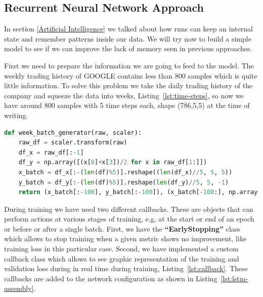 \subsection{Recurrent Neural Network Approach}

In section \ref{Artificial Intelligence} we talked about how \glspl{rnn} can keep an internal state and remember patterns inside our data. We will try now to build a simple model to see if we can improve the lack of memory seen in previous approaches.

First we need to prepare the information we are going to feed to the model. The weekly trading history of GOOGLE contains less than 800 samples which is quite little information. To solve this problem we take the daily trading history of the company and squeeze the data into weeks, Listing~\ref{lst:time-steps}, so now we have around 800 samples with 5 time steps each, shape (786,5,5) at the time of writing.

\begin{lstlisting}[language=python,caption=Week Time Steps GOOGLE,label={lst:time-steps}]
def week_batch_generator(raw, scaler):
    raw_df = scaler.transform(raw)
    df_x = raw_df[:-1]
    df_y = np.array([(x[0]+x[3])/2 for x in raw_df[1:]])
    x_batch = df_x[:-(len(df)%5)].reshape((len(df_x)//5, 5, 5)) 
    y_batch = df_y[:-(len(df)%5)].reshape(len(df_y)//5, 5, -1)
    return (x_batch[:-100], y_batch[:-100]), (x_batch[-100:], np.array(raw_df[1:-(len(df)%5),[0, 3]][-100:]))
\end{lstlisting}

During training we have used two different callbacks. These are objects that can perform actions at various stages of training, e.g, at the start or end of an epoch or before or after a single batch. First, we have the \textbf{\enquote{EarlyStopping}} class which allows to stop training when a given metric shows no improvement, like training loss in this particular case. Second, we have implemented a custom callback class which allows to see graphic representation of the training and validation loss during in real time during training, Listing~\ref{lst:callback}. These callbacks are added to the network configuration as shown in Listing~\ref{lst:lstm-assembly}.


